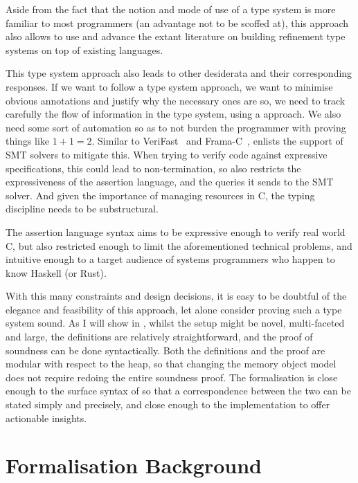 Aside from the fact that the notion and mode of use of a type system is more
familiar to most programmers (an advantage not to be scoffed at), this approach
also allows  to use and advance the extant literature on building
refinement type systems on top of existing languages.

This type system approach also leads to other desiderata and their
corresponding responses. If we want to follow a type system approach, we want
to minimise obvious annotations and justify why the necessary ones are so, we
need to track carefully the flow of information in the type system, using a
 approach. We also need some sort of automation so as to not
burden the programmer with proving things like $1 + 1 = 2$. Similar to
VeriFast~ and Frama-C~,
 enlists the support of SMT solvers to mitigate this. When trying to
verify code against expressive specifications, this could lead to
non-termination, so  also restricts the expressiveness of the assertion
language, and the queries it sends to the SMT solver. And given the importance
of managing resources in C, the typing discipline needs to be substructural.

The  assertion language syntax aims to be expressive enough to verify
real world C, but also restricted enough to limit the aforementioned technical
problems, and intuitive enough to a target audience of systems programmers who
happen to know Haskell (or Rust).

With this many constraints and design decisions, it is easy to be doubtful of the
elegance and feasibility of this approach, let alone consider proving such a
type system sound. As I will show in , whilst the setup
might be novel, multi-faceted and large, the definitions are relatively
straightforward, and the proof of soundness can be done syntactically. Both the
definitions and the proof are modular with respect to the heap, so that
changing the memory object model does not require redoing the entire soundness
proof. The formalisation is close enough to the surface syntax of  so
that a correspondence between the two can be stated simply and precisely, and
close enough to the implementation to offer actionable insights.

\chapter{Formalisation Background}%
\label{chap:formal-background}

